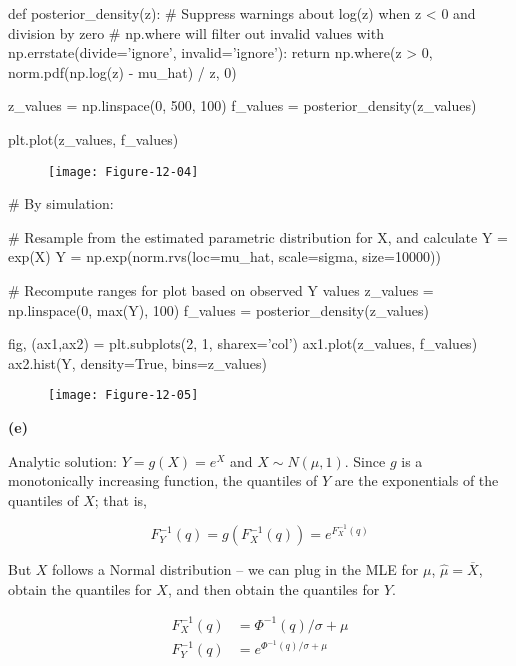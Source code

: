 \begin{python}
def posterior_density(z):
    # Suppress warnings about log(z) when z < 0 and division by zero 
    # np.where will filter out invalid values
    with np.errstate(divide='ignore', invalid='ignore'):
        return np.where(z > 0, norm.pdf(np.log(z) - mu_hat) / z, 0)
    
z_values = np.linspace(0, 500, 100)
f_values = posterior_density(z_values)

plt.plot(z_values, f_values)
\end{python}

\begin{figure}[H]
\texttt{[image: Figure-12-04]}
\end{figure}

\begin{python}
# By simulation:

# Resample from the estimated parametric distribution for X, and calculate Y = exp(X)
Y = np.exp(norm.rvs(loc=mu_hat, scale=sigma, size=10000))

# Recompute ranges for plot based on observed Y values
z_values = np.linspace(0, max(Y), 100)
f_values = posterior_density(z_values)

fig, (ax1,ax2) = plt.subplots(2, 1, sharex='col')
ax1.plot(z_values, f_values)
ax2.hist(Y, density=True, bins=z_values)
\end{python}

\begin{figure}[H]
\texttt{[image: Figure-12-05]}
\end{figure}

\textbf{(e)}

Analytic solution: \(Y = g(X) = e^X\) and \(X \sim N(\mu, 1)\). Since
\(g\) is a monotonically increasing function, the quantiles of \(Y\) are
the exponentials of the quantiles of \(X\); that is,

\[F_Y^{-1}(q) = g(F_X^{-1}(q)) = e^{F_X^{-1}(q)}\]

But \(X\) follows a Normal distribution -- we can plug in the MLE for
\(\mu\), \(\hat{\mu} = \overline{X}\), obtain the quantiles for \(X\),
and then obtain the quantiles for \(Y\).

\begin{align}
F_X^{-1}(q) &= \Phi^{-1}(q) / \sigma + \mu \\
F_Y^{-1}(q) &= e^{\Phi^{-1}(q) / \sigma + \mu}
\end{align}

